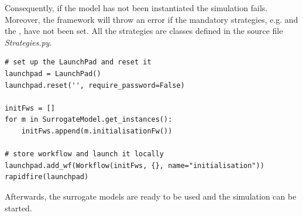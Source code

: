 Consequently, if the model has not been instantiated the simulation fails. 
Moreover, the framework will throw an error if the mandatory strategies, e.g.  {\outofBoundsStrategy} and the {\ParameterfittingStrategy}, have not been set. 
All the strategies are classes defined in the source file \emph{Strategies.py}.
%
\par
%
%
\begin{lstlisting}[style=lstPython, firstnumber=117]
# set up the LaunchPad and reset it
launchpad = LaunchPad()
launchpad.reset('', require_password=False)

initFws = []
for m in SurrogateModel.get_instances():
    initFws.append(m.initialisationFw())

# store workflow and launch it locally
launchpad.add_wf(Workflow(initFws, {}, name="initialisation"))
rapidfire(launchpad)
\end{lstlisting}
Afterwards, the surrogate models are ready to be used and the simulation can be started.
